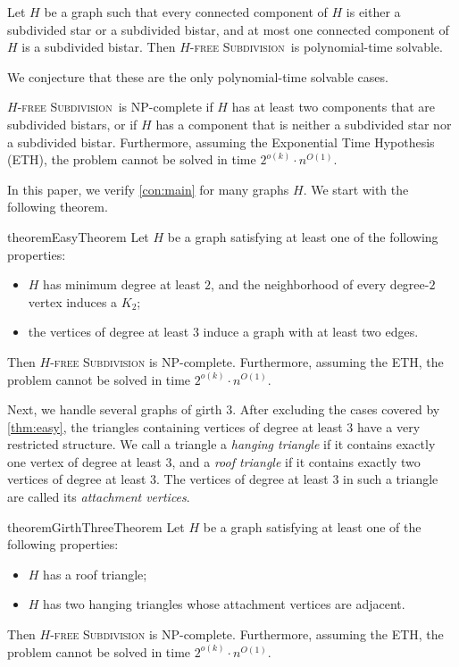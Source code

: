 \documentclass[a4paper,UKenglish,cleveref, autoref, thm-restate]{lipics-v2021}
\newcommand{\pname}[1]{\textnormal{\textsc{#1}}}
\newcommand{\HFS}{\pname{$H$-free Subdivision}}
\begin{document}
\begin{observation}
\label{obs:poly}
Let $H$ be a graph such that every connected component of $H$ is either a subdivided star or a subdivided bistar, and at most one connected component of $H$ is a subdivided bistar.
Then \HFS\ is polynomial-time solvable.
\end{observation}

We conjecture that these are the only polynomial-time solvable cases.

\begin{conjecture}
\label{con:main}
\HFS\ is NP-complete if $H$ has at least two components that are subdivided bistars, or if $H$ has a component that is neither a subdivided star nor a subdivided bistar.
Furthermore, assuming the Exponential Time Hypothesis (ETH), the problem cannot be solved in time $2^{o(k)}\cdot n^{O(1)}$.
\end{conjecture}

In this paper, we verify \cref{con:main} for many graphs $H$.
We start with the following theorem.

\begin{restatable}{theorem}{EasyTheorem}
\label{thm:easy}
Let $H$ be a graph satisfying at least one of the following properties:
\begin{itemize}
    \item $H$ has minimum degree at least $2$, and the neighborhood of every degree-$2$ vertex induces a $K_2$;
    \item the vertices of degree at least $3$ induce a graph with at least two edges.
\end{itemize}
Then \textsc{$H$-free Subdivision} is NP-complete.
Furthermore, assuming the ETH, the problem cannot be solved in time
$2^{o(k)}\cdot n^{O(1)}$.
\end{restatable}

Next, we handle several graphs of girth $3$.
After excluding the cases covered by \cref{thm:easy}, the triangles containing vertices of degree at least $3$ have a very restricted structure.
We call a triangle a \emph{hanging triangle} if it contains exactly one vertex of degree at least $3$, and a \emph{roof triangle} if it contains exactly two vertices of degree at least $3$.
The vertices of degree at least $3$ in such a triangle are called its \emph{attachment vertices}.

\begin{restatable}{theorem}{GirthThreeTheorem}
\label{thm:girth3}
Let $H$ be a graph satisfying at least one of the following properties:
\begin{itemize}
    \item $H$ has a roof triangle;
    \item $H$ has two hanging triangles whose attachment vertices are adjacent.
\end{itemize}
Then \textsc{$H$-free Subdivision} is NP-complete.
Furthermore, assuming the ETH, the problem cannot be solved in time
$2^{o(k)}\cdot n^{O(1)}$.
\end{restatable}
\end{document}
